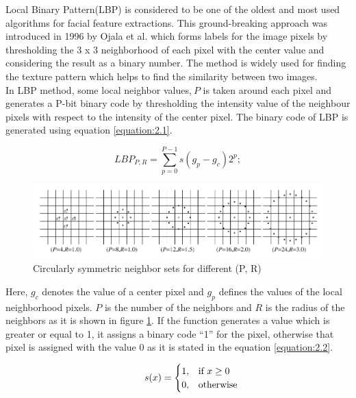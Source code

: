 \documentclass[12pt]{article}
\newcommand\tab[1][1cm]{\hspace*{#1}}
\begin{document}
Local Binary Pattern(LBP) is considered to be one of the oldest and most used algorithms for facial feature extractions. This ground-breaking approach was introduced in 1996 by Ojala et al. \cite{lbp01} which forms labels for the image pixels by thresholding the 3 x 3 neighborhood of each pixel with the center value and considering the result as a binary number. The method is widely used for finding the texture pattern which helps to find the similarity
between two images.\\

In LBP method, some local neighbor values,$~P$ is taken around each pixel and generates
a P-bit binary code by thresholding the intensity value of the neighbour pixels
with respect to the intensity of the center pixel. The binary code of LBP is generated using equation  \ref{equation:2.1}.

\begin{equation}
LBP_{P,R}=\sum\limits_{p=0}^{P-1}{s({{g}_{p}}-{{g}_{c}}){{2}^{p}}}; 
\label{equation:2.1}
\end{equation}

\begin{figure}[h]
	\centering
	\includegraphics[width=\textwidth]{differentRadius}
	\caption{Circularly symmetric neighbor sets for different (P, R)}
	\label{figure:radius2}
\end{figure} 
Here, $g_c$ denotes the  value of a center pixel and $g_p$ defines the values of the local neighborhood pixels. $P$ is the number of the neighbors and $R$ is the radius of the neighbors as it is shown in figure \ref{figure:radius2}. If the function generates a value which is greater or equal to 1, it assigns a binary code ``1'' for the pixel, otherwise that pixel is assigned with the value 0 as it is stated in the equation \ref{equation:2.2}.

\begin{equation}
\tab  s(x)= 
\begin{cases}
1,& \text{if } x\geq 0\\
0,              & \text{otherwise}
\end{cases}
\label{equation:2.2}
\end{equation}
\end{document}
